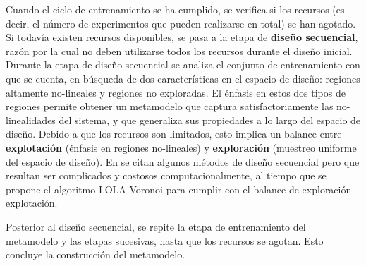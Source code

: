 Cuando el ciclo de entrenamiento se ha cumplido, se verifica si los recursos (es decir, el número de experimentos que pueden realizarse en total) se han agotado. Si todavía existen recursos disponibles, se pasa a la etapa de \textbf{diseño secuencial}, razón por la cual no deben utilizarse todos los recursos durante el diseño inicial. Durante la etapa de diseño secuencial se analiza el conjunto de entrenamiento con que se cuenta, en búsqueda de dos características en el espacio de diseño: regiones altamente no-lineales y regiones no exploradas. El énfasis en estos dos tipos de regiones permite obtener un metamodelo que captura satisfactoriamente las no-linealidades del sistema, y que generaliza sus propiedades a lo largo del espacio de diseño. Debido a que los recursos son limitados, esto implica un balance entre \textbf{explotación} (énfasis en regiones no-lineales) y \textbf{exploración} (muestreo uniforme del espacio de diseño). En \cite{crombecq2009} se citan algunos métodos de diseño secuencial pero que resultan ser complicados y costosos computacionalmente, al tiempo que se propone el algoritmo LOLA-Voronoi para cumplir con el balance de exploración-explotación.

Posterior al diseño secuencial, se repite la etapa de entrenamiento del metamodelo y las etapas sucesivas, hasta que los recursos se agotan. Esto concluye la construcción del metamodelo.


